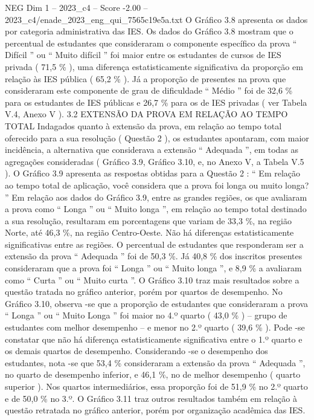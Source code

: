 \begin{textsample}{NEG Dim 1 – 2023\_c4 – Score -2.00 – 2023\_c4/enade\_2023\_eng\_qui\_7565c19e5a.txt}
O Gráfico 3.8 apresenta os dados por categoria administrativa das IES.
Os dados do Gráfico 3.8 mostram que o percentual de estudantes que consideraram o componente específico da prova “ Difícil ” ou “ Muito difícil ” foi maior entre os estudantes de cursos de IES privada ( 71,5 \% ), uma diferença estatisticamente significativa da proporção em relação às IES pública ( 65,2 \% ).
Já a proporção de presentes na prova que consideraram este componente de grau de dificuldade “ Médio ” foi de 32,6 \% para os estudantes de IES públicas e 26,7 \% para os de IES privadas ( ver Tabela V.4, Anexo V ). 3.2 EXTENSÃO DA PROVA EM RELAÇÃO AO TEMPO TOTAL Indagados quanto à extensão da prova, em relação ao tempo total oferecido para a sua resolução ( Questão 2 ), os estudantes apontaram, com maior incidência, a alternativa que considerava a extensão “ Adequada ”, em todas as agregações consideradas ( Gráfico 3.9, Gráfico 3.10, e, no Anexo V, a Tabela V.5 ).
O Gráfico 3.9 apresenta as respostas obtidas para a Questão 2 : “ Em relação ao tempo total de aplicação, você considera que a prova foi longa ou muito longa? ” Em relação aos dados do Gráfico 3.9, entre as grandes regiões, os que avaliaram a prova como “ Longa ” ou “ Muito longa ”, em relação ao tempo total destinado a sua resolução, resultaram em porcentagens que variam de 33,3 \%, na região Norte, até 46,3 \%, na região Centro-Oeste.
Não há diferenças estatisticamente significativas entre as regiões.
O percentual de estudantes que responderam ser a extensão da prova “ Adequada ” foi de 50,3 \%.
Já 40,8 \% dos inscritos presentes consideraram que a prova foi “ Longa ” ou “ Muito longa ”, e 8,9 \% a avaliaram como “ Curta ” ou “ Muito curta ”.
O Gráfico 3.10 traz mais resultados sobre a questão tratada no gráfico anterior, porém por quartos de desempenho.
No Gráfico 3.10, observa -se que a proporção de estudantes que consideraram a prova “ Longa ” ou “ Muito Longa ” foi maior no 4.º quarto ( 43,0 \% ) – grupo de estudantes com melhor desempenho – e menor no 2.º quarto ( 39,6 \% ).
Pode -se constatar que não há diferença estatisticamente significativa entre o 1.º quarto e os demais quartos de desempenho.
Considerando -se o desempenho dos estudantes, nota -se que 53,4 \% consideraram a extensão da prova “ Adequada ”, no quarto de desempenho inferior, e 46,1 \%, no de melhor desempenho ( quarto superior ).
Nos quartos intermediários, essa proporção foi de 51,9 \% no 2.º quarto e de 50,0 \% no 3.º.
O Gráfico 3.11 traz outros resultados também em relação à questão retratada no gráfico anterior, porém por organização acadêmica das IES.

\end{textsample}
